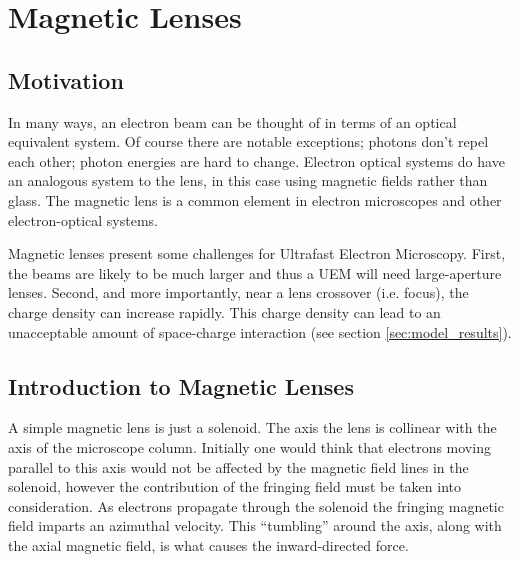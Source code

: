 
\section{Magnetic Lenses} \label{sec:mag_lens}

\subsection{Motivation}

In many ways, an electron beam can be thought of in terms of an optical equivalent system. 
Of course there are notable exceptions; photons don't repel each other; photon energies are hard to change.
Electron optical systems do have an analogous system to the lens, in this case using magnetic fields rather than glass. 
The magnetic lens is a common element in electron microscopes and other electron-optical systems.

Magnetic lenses present some challenges for Ultrafast Electron Microscopy.
First, the beams are likely to be much larger and thus a UEM will need large-aperture lenses.
Second, and more importantly, near a lens crossover (i.e. focus), the charge density can increase rapidly.
This charge density can lead to an unacceptable amount of space-charge interaction (see section \ref{sec:model_results}).

\subsection{Introduction to Magnetic Lenses} 

A simple magnetic lens is just a solenoid.
The axis the lens is collinear with the axis of the microscope column.
Initially one would think that electrons moving parallel to this axis would not be affected by the magnetic field lines in the solenoid, however the contribution of the fringing field must be taken into consideration.
As electrons propagate through the solenoid the fringing magnetic field imparts an azimuthal velocity.
This ``tumbling'' around the axis, along with the axial magnetic field, is what causes the inward-directed force. 

